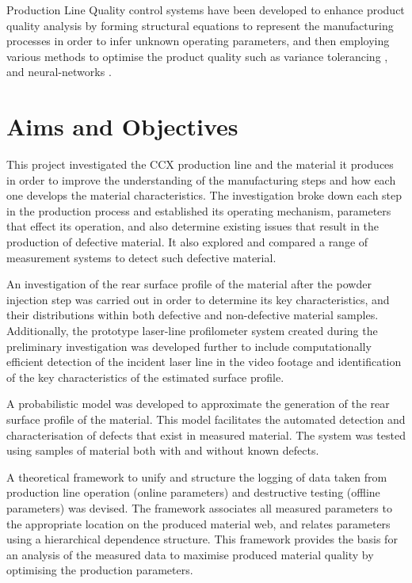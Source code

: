 \documentclass[12pt]{report}
\begin{document}
        Production Line Quality control systems have been developed to enhance product quality analysis by forming structural equations to represent the manufacturing processes in order to infer unknown operating parameters, and then employing various methods to optimise the product quality such as variance tolerancing \cite{suh2007dynamic},\cite{koo2001variance} and neural-networks \cite{ohshima2000quality}.
        
    \section{Aims and Objectives}
        This project investigated the CCX production line and the material it produces in order to improve the understanding of the manufacturing steps and how each one develops the material characteristics. The investigation broke down each step in the production process and established its operating mechanism, parameters that effect its operation, and also determine existing issues that result in the production of defective material. It also explored and compared a range of measurement systems to detect such defective material.
        
        An investigation of the rear surface profile of the material after the powder injection step was carried out in order to determine its key characteristics, and their distributions within both defective and non-defective material samples. Additionally, the prototype laser-line profilometer system created during the preliminary investigation was developed further to include computationally efficient detection of the incident laser line in the video footage and identification of the key characteristics of the estimated surface profile.
        
        A probabilistic model was developed to approximate the generation of the rear surface profile of the material. This model facilitates the automated detection and characterisation of defects that exist in measured material. The system was tested using samples of material both with and without known defects.
        
        A theoretical framework to unify and structure the logging of data taken from production line operation (online parameters) and destructive testing (offline parameters) was devised. The framework associates all measured parameters to the appropriate location on the produced material web, and relates parameters using a hierarchical dependence structure. This framework provides the basis for an analysis of the measured data to maximise produced material quality by optimising the production parameters.
        
\end{document}
